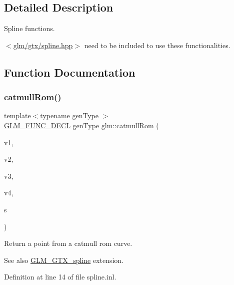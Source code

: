 \subsection{Detailed Description}
Spline functions. 

$<$\hyperlink{spline_8hpp}{glm/gtx/spline.\+hpp}$>$ need to be included to use these functionalities. 

\subsection{Function Documentation}
\mbox{\label{group__gtx__spline_ga8119c04f8210fd0d292757565cd6918d}} 
\subsubsection{\texorpdfstring{catmull\+Rom()}{catmullRom()}}
{\footnotesize\ttfamily template$<$typename gen\+Type $>$ \\
\hyperlink{setup_8hpp_ab2d052de21a70539923e9bcbf6e83a51}{G\+L\+M\+\_\+\+F\+U\+N\+C\+\_\+\+D\+E\+CL} gen\+Type glm\+::catmull\+Rom (\begin{DoxyParamCaption}\item[{gen\+Type const \&}]{v1,  }\item[{gen\+Type const \&}]{v2,  }\item[{gen\+Type const \&}]{v3,  }\item[{gen\+Type const \&}]{v4,  }\item[{typename gen\+Type\+::value\+\_\+type const \&}]{s }\end{DoxyParamCaption})}

Return a point from a catmull rom curve. \begin{DoxySeeAlso}{See also}
\hyperlink{group__gtx__spline}{G\+L\+M\+\_\+\+G\+T\+X\+\_\+spline} extension. 
\end{DoxySeeAlso}


Definition at line 14 of file spline.\+inl.

\mbox{\label{group__gtx__spline_ga6b867eb52e2fc933d2e0bf26aabc9a70}} 
